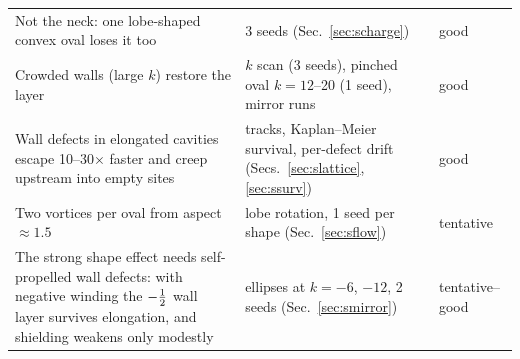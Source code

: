 \begin{table}[H]
\begin{tabularx}{\textwidth}{>{\raggedright\arraybackslash}p{4.3cm}X>{\raggedright\arraybackslash}p{1.8cm}}
Not the neck: one lobe-shaped convex oval loses it too & 3 seeds (Sec.~\ref{sec:scharge}) & good\\
Crowded walls (large $k$) restore the layer & $k$ scan (3 seeds), pinched oval $k=12$--20 (1 seed), mirror runs & good\\
Wall defects in elongated cavities escape 10--30$\times$ faster and creep upstream into empty sites & tracks, Kaplan--Meier survival, per-defect drift (Secs.~\ref{sec:slattice}, \ref{sec:ssurv}) & good\\
Two vortices per oval from aspect $\approx1.5$ & lobe rotation, 1 seed per shape (Sec.~\ref{sec:sflow}) & tentative\\
The strong shape effect needs self-propelled wall defects: with negative winding the $-\tfrac12$ wall layer survives elongation, and shielding weakens only modestly & ellipses at $k=-6$, $-12$, 2 seeds (Sec.~\ref{sec:smirror}) & tentative--good\\\bottomrule
\end{tabularx}
\end{table}
\clearpage
